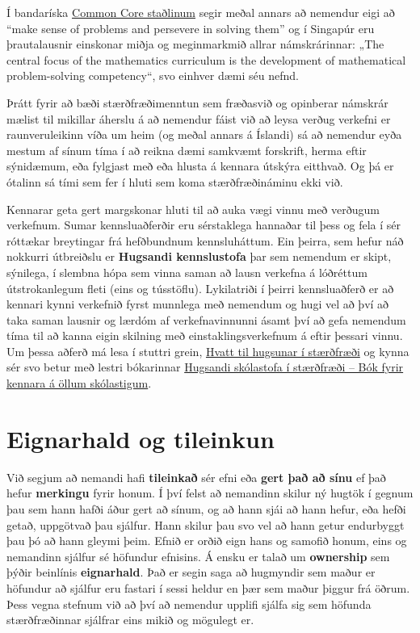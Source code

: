 \documentclass[
  icelandic,
]{book}
\theoremstyle{definition}
\theoremstyle{definition}
\theoremstyle{definition}
\theoremstyle{definition}
\theoremstyle{remark}
\begin{document}
Í bandaríska \href{https://www.thecorestandards.org/Math/Practice/}{Common Core staðlinum} segir meðal annars að nemendur eigi að ``make sense of problems and persevere in solving them'' og í Singapúr eru þrautalausnir einskonar miðja og meginmarkmið allrar námskrárinnar: „The central focus of the mathematics curriculum is the development of mathematical problem-solving competency``, svo einhver dæmi séu nefnd.

Þrátt fyrir að bæði stærðfræðimenntun sem fræðasvið og opinberar námskrár mælist til mikillar áherslu á að nemendur fáist við að leysa verðug verkefni er raunveruleikinn víða um heim (og meðal annars á Íslandi) sá að nemendur eyða mestum af sínum tíma í að reikna dæmi samkvæmt forskrift, herma eftir sýnidæmum, eða fylgjast með eða hlusta á kennara útskýra eitthvað. Og þá er ótalinn sá tími sem fer í hluti sem koma stærðfræðináminu ekki við.

Kennarar geta gert margskonar hluti til að auka vægi vinnu með verðugum verkefnum. Sumar kennsluaðferðir eru sérstaklega hannaðar til þess og fela í sér róttækar breytingar frá hefðbundnum kennsluháttum. Ein þeirra, sem hefur náð nokkurri útbreiðslu er \textbf{Hugsandi kennslustofa} þar sem nemendum er skipt, sýnilega, í slembna hópa sem vinna saman að lausn verkefna á lóðréttum útstrokanlegum fleti (eins og tússtöflu). Lykilatriði í þeirri kennsluaðferð er að kennari kynni verkefnið fyrst munnlega með nemendum og hugi vel að því að taka saman lausnir og lærdóm af verkefnavinnunni ásamt því að gefa nemendum tíma til að kanna eigin skilning með einstaklingsverkefnum á eftir þessari vinnu. Um þessa aðferð má lesa í stuttri grein, \href{https://skolathraedir.is/2019/11/15/hvatt-til-hugsunar-i-staerdfraedi/}{Hvatt til hugsunar í stærðfræði} og kynna sér svo betur með lestri bókarinnar \href{https://haskolautgafan.is/en/products/hugsandi-skolastofa-i-staerdfraedi-bok-fyrir-kennara-a-ollum-skolastigum}{Hugsandi skólastofa í stærðfræði -- Bók fyrir kennara á öllum skólastigum}.

\section{Eignarhald og tileinkun}\label{eignarhald}

Við segjum að nemandi hafi \textbf{tileinkað} sér efni eða \textbf{gert það að sínu} ef það hefur \textbf{merkingu} fyrir honum. Í því felst að nemandinn skilur ný hugtök í gegnum þau sem hann hafði áður gert að sínum, og að hann sjái að hann hefur, eða hefði getað, uppgötvað þau sjálfur. Hann skilur þau svo vel að hann getur endurbyggt þau þó að hann gleymi þeim. Efnið er orðið eign hans og samofið honum, eins og nemandinn sjálfur sé höfundur efnisins. Á ensku er talað um \textbf{ownership} sem þýðir beinlínis \textbf{eignarhald}. Það er segin saga að hugmyndir sem maður er höfundur að sjálfur eru fastari í sessi heldur en þær sem maður þiggur frá öðrum. Þess vegna stefnum við að því að nemendur upplifi sjálfa sig sem höfunda stærðfræðinnar sjálfrar eins mikið og mögulegt er.
\end{document}
